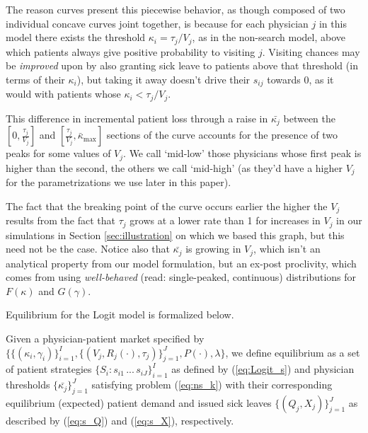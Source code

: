 \documentclass[../main.tex]{subfiles}
\begin{document}
The reason curves present this piecewise behavior, as though composed of two individual concave curves joint together, is because for each physician $j$ in this model there exists the threshold $\kappa_i = \tau_j/V_j$, as in the non-search model, above which patients always give positive probability to visiting $j$. Visiting chances may be \textit{improved} upon by also granting sick leave to patients above that threshold (in terms of their $\kappa_i$), but taking it away doesn't drive their $s_{ij}$ towards 0, as it would with patients whose $\kappa_i < \tau_j/V_j$.

This difference in incremental patient loss through a raise in $\bar{\kappa_j}$ between the $[0,\frac{\tau_j}{V_j}]$ and $[\frac{\tau_j}{V_j},\bar{\kappa}_{\max}]$ sections of the curve accounts for the presence of two peaks for some values of $V_j$. We call `mid-low' those physicians whose first peak is higher than the second, the others we call `mid-high' (as they'd have a higher $V_j$ for the parametrizations we use later in this paper).

The fact that the breaking point of the curve occurs earlier the higher the $V_j$ results from the fact that $\tau_j$ grows at a lower rate than 1 for increases in $V_j$ in our simulations in Section \ref{sec:illustration} on which we based this graph, but this need not be the case. Notice also that $\bar{\kappa_j}$ is growing in $V_j$, which isn't an analytical property from our model formulation, but an ex-post proclivity, which comes from using \textit{well-behaved} (read: single-peaked, continuous) distributions for $F(\kappa)$ and $G(\gamma)$.

Equilibrium for the Logit model is formalized below.

\vspace{0.5em}
\begin{equilibrium}
    \label{Logit_eq}
Given a physician-patient market specified by $\{\{(\kappa_i,\gamma_i)\}_{i =1}^{I},\{(V_j, R_j(\cdot), \tau_j)\}_{j =1}^{J}, P(\cdot), \lambda \}$, we define equilibrium as a set of patient strategies $\{S_i: s_{i1} \, ... \, s_{iJ}\}_{i =1}^{I}$ as defined by (\ref{eq:Logit_s}) and physician thresholds $\{\bar{\kappa_j}\}_{j =1}^{J}$ satisfying problem (\ref{eq:ns_k}) with their corresponding equilibrium (expected) patient demand and issued sick leaves $\{(Q_j,X_j)\}_{j =1}^{J}$ as described by (\ref{eq:s_Q}) and (\ref{eq:s_X}), respectively.
\end{equilibrium}
\end{document}
